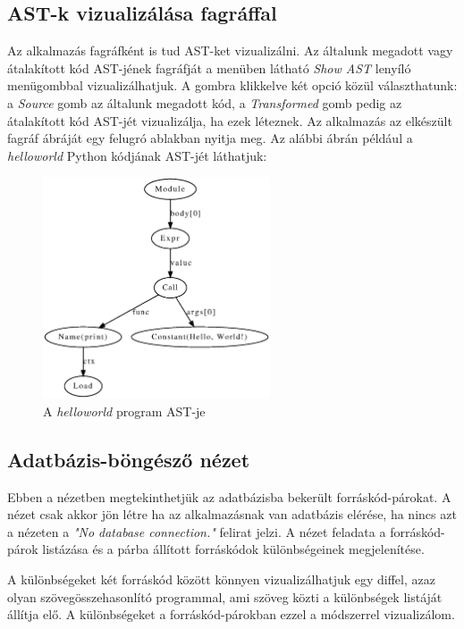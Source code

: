 \subsection{AST-k vizualizálása fagráffal}

Az alkalmazás fagráfként is tud AST-ket vizualizálni.
Az általunk megadott vagy átalakított kód AST-jének fagráfját a menüben látható
\emph{Show AST} lenyíló menügombbal vizualizálhatjuk.
A gombra klikkelve két opció közül választhatunk:
a \emph{Source} gomb az általunk megadott kód, a \emph{Transformed} gomb pedig az átalakított kód
AST-jét vizualizálja, ha ezek léteznek.
Az alkalmazás az elkészült fagráf ábráját egy felugró ablakban nyitja meg.
Az alábbi ábrán például a \emph{helloworld} Python kódjának AST-jét láthatjuk:

\begin{figure}[H]
	\centering
	\includegraphics[width=0.6\textwidth]{images/figs/ast_graph.eps}
	\caption{A \emph{helloworld} program AST-je}
\end{figure}

\subsection{Adatbázis-böngésző nézet}

Ebben a nézetben megtekinthetjük az adatbázisba bekerült forráskód-párokat.
A nézet csak akkor jön létre ha az alkalmazásnak van adatbázis elérése,
ha nincs azt a nézeten a \emph{"No database connection."} felirat jelzi.
A nézet feladata a forráskód-párok listázása és a párba állított forráskódok
különbségeinek megjelenítése.

A különbségeket két forráskód között könnyen vizualizálhatjuk egy diffel,
azaz olyan szövegösszehasonlító programmal, ami szöveg közti a különbségek
listáját állítja elő.
A különbségeket a forráskód-párokban ezzel a módszerrel vizualizálom.

